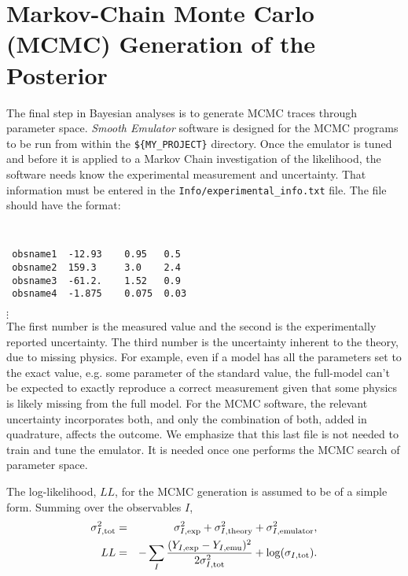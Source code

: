 \documentclass[UserManual.tex]{subfiles}
\begin{document}
\setcounter{section}{6}
\section{Markov-Chain Monte Carlo (MCMC) Generation of the Posterior}\label{sec:mcmc}

The final step in Bayesian analyses is to generate MCMC traces through parameter space. {\it Smooth Emulator} software is designed for the MCMC programs to be run from within the {\tt \$\{MY\_PROJECT\}} directory. Once the emulator is tuned and before it is applied to a Markov Chain investigation of the likelihood, the software needs know the experimental measurement and uncertainty. That information must be entered in the {\tt Info/experimental\_info.txt} file. The file should have the format:
{\tt
\begin{verbatim}
 obsname1  -12.93    0.95   0.5
 obsname2  159.3     3.0    2.4
 obsname3  -61.2.    1.52   0.9
 obsname4  -1.875    0.075  0.03
\end{verbatim}}
\vspace*{-16pt}
 \hspace*{28pt}$\vdots$\\
The first number is the measured value and the second is the experimentally reported uncertainty. The third number is the uncertainty inherent to the theory, due to missing physics. For example, even if a model has all the parameters set to the exact value, e.g. some parameter of the standard value, the full-model can't be expected to exactly reproduce a correct measurement given that some physics is likely missing from the full model. For the MCMC software, the relevant uncertainty incorporates both, and only the combination of both, added in quadrature, affects the outcome. We emphasize that this last file is not needed to train and tune the emulator. It is needed once one performs the MCMC search of parameter space.

The log-likelihood, $LL$, for the MCMC generation is assumed to be of a simple form. Summing over the observables $I$,
\begin{eqnarray*}
\sigma_{I,{\rm tot}}^{2}&=&\sigma_{I,{\rm exp}}^2+\sigma_{I,{\rm theory}}^2+\sigma_{I,{\rm emulator}}^2,\\
LL&=&-\sum_{I}\frac{(Y_{I,{\rm exp}}-Y_{I,{\rm emu}})^{2}}{2\sigma_{I,{\rm tot}}^{2}}+\log(\sigma_{I,{\rm tot}}).
\end{eqnarray*}
\end{document}
